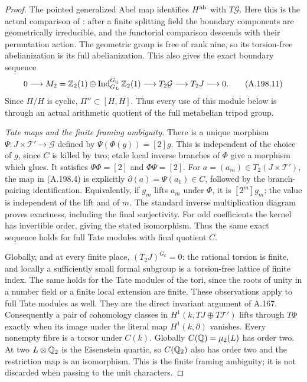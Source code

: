 \begin{proof}
The pointed generalized Abel map identifies \(H^{\rm ab}\)
with \(T\mathcal G\).  Here this is the actual comparison of
\cite[Proposition A.8(ii),(iii), pp.232--234]{BIR_MochizukiAlbanese2012}:
after a finite splitting field the boundary components are
geometrically irreducible, and the functorial comparison descends
with their permutation action.  The geometric group is free of
rank nine, so its torsion-free abelianization is its full
abelianization.  This also gives the exact boundary sequence
\[
 0\longrightarrow M_2=\mathbb Z_2(1)\oplus
       \operatorname{Ind}_{G_L}^{G_\mathbb Q}\mathbb Z_2(1)
 \longrightarrow T_2\mathcal G\longrightarrow T_2J
 \longrightarrow0.
\tag{A.198.11}
\]
Since \(\Pi/H\) is cyclic, \(\Pi''\subset\overline{[H,H]}\).
Thus every use of this module below is through an actual arithmetic
quotient of the full metabelian tripod group.

\emph{Tate maps and the finite framing ambiguity.}
There is a unique morphism \(\Psi:J\times\mathcal T'\to\mathcal G\)
defined by \(\Psi(\Phi(g))=[2]g\).  This is independent of the
choice of \(g\), since \(C\) is killed by two; etale local
inverse branches of \(\Phi\) give a morphism which glues.
It satisfies \(\Psi\Phi=[2]\) and \(\Phi\Psi=[2]\).
For \(a=(a_m)\in T_2(J\times\mathcal T')\), the map in
(A.198.4) is explicitly
\(\partial(a)=\Psi(a_1)\in C\), followed by the branch-pairing
identification.  Equivalently, if \(g_m\) lifts \(a_m\) under
\(\Phi\), it is \([2^m]g_m\); the value is independent of
the lift and of \(m\).  The standard inverse multiplication
diagram proves exactness, including the final surjectivity.
For odd coefficients the kernel has invertible order, giving
the stated isomorphism.  Thus the same exact sequence holds
for full Tate modules with final quotient \(C\).

Globally, and at every finite place, \((T_2J)^{G_k}=0\):
the rational torsion is finite, and locally a sufficiently small
formal subgroup is a torsion-free lattice of finite index.
The same holds for the Tate modules of the tori, since the
roots of unity in a number field or a finite local extension are
finite.  These observations apply to full Tate modules as well.
They are the direct invariant argument of A.167.
Consequently a pair of cohomology classes in
\(H^1(k,TJ\oplus T\mathcal T')\) lifts through \(T\Phi\)
exactly when its image under the literal map
\(H^1(k,\partial)\) vanishes.  Every nonempty fibre is a torsor
under \(C(k)\).  Globally \(C(\mathbb Q)=\mu_2(L)\) has order two.
At two \(L\otimes\mathbb Q_2\) is the Eisenstein quartic, so
\(C(\mathbb Q_2)\) also has order two and the restriction map is
an isomorphism.  This is the finite framing ambiguity; it is
not discarded when passing to the unit characters.


\end{proof}
